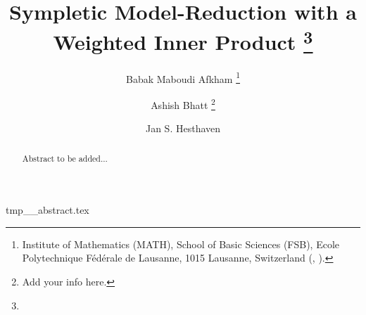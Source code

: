 \documentclass[review]{siamart1116}
\title{Sympletic Model-Reduction with a Weighted Inner Product%
  \thanks{%
\funding{Funding information goes here.}} }
\author{Babak Maboudi Afkham%
  \thanks{Institute of Mathematics (MATH), School of Basic Sciences (FSB), Ecole Polytechnique F\'ed\'erale de Lausanne, 1015 Lausanne, Switzerland (\email{babak.maboudi@epfl.ch}, \email{jan.hesthaven@epfl.ch}).}%
  \and
  Ashish Bhatt%
  \thanks{Add your info here.}
  \and
  Jan S. Hesthaven%
  \footnotemark[2]
}
\numberwithin{theorem}{section}
\begin{document}
\maketitle

\begin{tcbverbatimwrite}{tmp_\jobname_abstract.tex}
\begin{abstract}
	Abstract to be added...
\end{abstract}

\begin{keywords}
   
\end{keywords}

\begin{AMS}
	
\end{AMS}
\end{tcbverbatimwrite}











\end{document}
